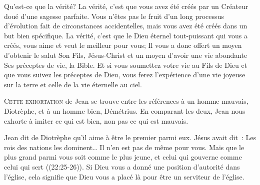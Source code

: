 Qu'est-ce que la vérité? La vérité, c'est que vous avez été créés
 par un Créateur doué d'une sagesse parfaite.
 Vous n'êtes pas le fruit d'un long processus d'évolution
 fait de circonstances accidentelles, mais vous avez été créés
 dans un but bien spécifique. La vérité, c'est que le Dieu éternel
 tout-puissant qui vous a créés, vous aime et veut le meilleur pour vous;
 Il vous a donc offert un moyen d'obtenir le salut
 \ocadr Son Fils, Jésus-Christ \fcadr{} et un moyen d'avoir une vie abondante
 \ocadr Ses préceptes de vie, la Bible.
 Et si vous soumettez votre vie au Fils de Dieu et que vous suivez
 les préceptes de Dieu, vous ferez l'expérience d'une vie joyeuse
 sur la terre et celle de la vie éternelle au ciel. 

\dvrule







\lettrine{C}{ette exhortation} de Jean se trouve entre les références
 à un homme mauvais, Diotrèphe, et à un homme bien, 
 Démétrius.
 En comparant les deux, Jean nous exhorte à imiter ce qui est bien, 
 non pas ce qui est mauvais. 

Jean dit de Diotrèphe qu'il \og aime à être le premier parmi eux. \fg{}
 Jésus avait dit~: 
 \fg{} Les rois des nations les dominent\dots{}
 Il n'en est pas de même pour vous. Mais que le plus grand parmi vous
 soit comme le plus jeune, et celui qui gouverne comme celui qui sert \fg{}
 ((22:25-26)).
 Si Dieu vous a donné une position d'autorité dans l'église,
 cela signifie que Dieu vous a placé là pour être un serviteur de l'église.


